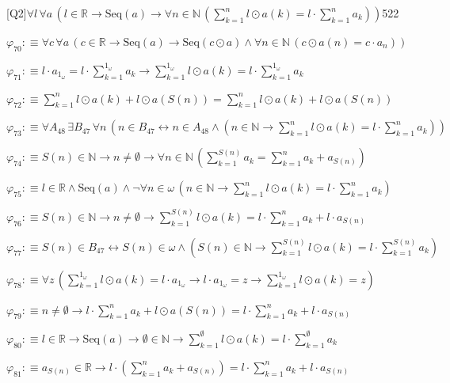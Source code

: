 \begin{fullproof}{[Q2]}{$\forall l\,\forall a\,(l \in \mathbb{R} \to \mathrm{Seq}(a) \to \forall n \in \mathbb{N}\,({\textstyle\sum_{k=1}^{n} l \odot a(k)} = l \cdot {\textstyle\sum_{k=1}^{n} a_{k}}))$}{522}
\begin{abbrevlist}
\item $\varphi_{70} :\equiv \forall c\,\forall a\,(c \in \mathbb{R} \to \mathrm{Seq}(a) \to \mathrm{Seq}(c \odot a) \land \forall n \in \mathbb{N}\,(c \odot a(n) = c \cdot a_{n}))$
\item $\varphi_{71} :\equiv l \cdot a_{1_{\omega}} = l \cdot {\textstyle\sum_{k=1}^{1_{\omega}} a_{k}} \to {\textstyle\sum_{k=1}^{1_{\omega}} l \odot a(k)} = l \cdot {\textstyle\sum_{k=1}^{1_{\omega}} a_{k}}$
\item $\varphi_{72} :\equiv {\textstyle\sum_{k=1}^{n} l \odot a(k)} + l \odot a(S(n)) = {\textstyle\sum_{k=1}^{n} l \odot a(k)} + l \odot a(S(n))$
\item $\varphi_{73} :\equiv \forall A_{48}\,\exists B_{47}\,\forall n\,(n \in B_{47} \leftrightarrow n \in A_{48} \land (n \in \mathbb{N} \to {\textstyle\sum_{k=1}^{n} l \odot a(k)} = l \cdot {\textstyle\sum_{k=1}^{n} a_{k}}))$
\item $\varphi_{74} :\equiv S(n) \in \mathbb{N} \to n \neq \emptyset \to \forall n \in \mathbb{N}\,({\textstyle\sum_{k=1}^{S(n)} a_{k}} = {\textstyle\sum_{k=1}^{n} a_{k}} + a_{S(n)})$
\item $\varphi_{75} :\equiv l \in \mathbb{R} \land \mathrm{Seq}(a) \land \neg \forall n \in \omega\,(n \in \mathbb{N} \to {\textstyle\sum_{k=1}^{n} l \odot a(k)} = l \cdot {\textstyle\sum_{k=1}^{n} a_{k}})$
\item $\varphi_{76} :\equiv S(n) \in \mathbb{N} \to n \neq \emptyset \to {\textstyle\sum_{k=1}^{S(n)} l \odot a(k)} = l \cdot {\textstyle\sum_{k=1}^{n} a_{k}} + l \cdot a_{S(n)}$
\item $\varphi_{77} :\equiv S(n) \in B_{47} \leftrightarrow S(n) \in \omega \land (S(n) \in \mathbb{N} \to {\textstyle\sum_{k=1}^{S(n)} l \odot a(k)} = l \cdot {\textstyle\sum_{k=1}^{S(n)} a_{k}})$
\item $\varphi_{78} :\equiv \forall z\,({\textstyle\sum_{k=1}^{1_{\omega}} l \odot a(k)} = l \cdot a_{1_{\omega}} \to l \cdot a_{1_{\omega}} = z \to {\textstyle\sum_{k=1}^{1_{\omega}} l \odot a(k)} = z)$
\item $\varphi_{79} :\equiv n \neq \emptyset \to l \cdot {\textstyle\sum_{k=1}^{n} a_{k}} + l \odot a(S(n)) = l \cdot {\textstyle\sum_{k=1}^{n} a_{k}} + l \cdot a_{S(n)}$
\item $\varphi_{80} :\equiv l \in \mathbb{R} \to \mathrm{Seq}(a) \to \emptyset \in \mathbb{N} \to {\textstyle\sum_{k=1}^{\emptyset} l \odot a(k)} = l \cdot {\textstyle\sum_{k=1}^{\emptyset} a_{k}}$
\item $\varphi_{81} :\equiv a_{S(n)} \in \mathbb{R} \to l \cdot ({\textstyle\sum_{k=1}^{n} a_{k}} + a_{S(n)}) = l \cdot {\textstyle\sum_{k=1}^{n} a_{k}} + l \cdot a_{S(n)}$

\end{abbrevlist}
\end{fullproof}
